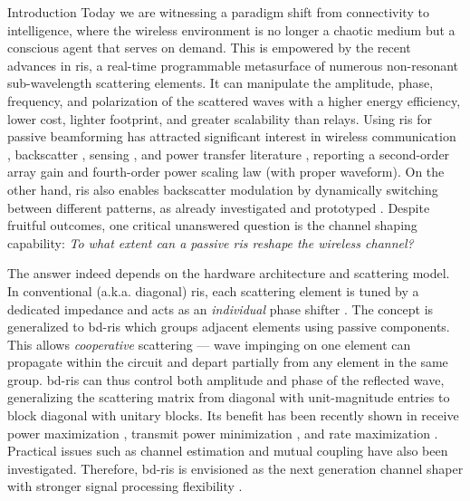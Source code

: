 \documentclass[journal]{IEEEtran}
\begin{document}
\glsresetall

\begin{section}{Introduction}
	Today we are witnessing a paradigm shift from connectivity to intelligence, where the wireless environment is no longer a chaotic medium but a conscious agent that serves on demand.
	This is empowered by the recent advances in \gls{ris}, a real-time programmable metasurface of numerous non-resonant sub-wavelength scattering elements.
	It can manipulate the amplitude, phase, frequency, and polarization of the scattered waves \cite{Basar2019} with a higher energy efficiency, lower cost, lighter footprint, and greater scalability than relays.
	Using \gls{ris} for {passive beamforming} has attracted significant interest in wireless communication \cite{Wu2019,Wu2020c,Yang2020,Zheng2021}, backscatter \cite{Jia2020,Liang2022}, sensing \cite{Liu2022a,Hua2023}, and power transfer literature \cite{Wu2021d,Feng2022,Zhao2022}, reporting a second-order array gain and fourth-order power scaling law (with proper waveform).
	On the other hand, \gls{ris} also enables {backscatter modulation} by dynamically switching between different patterns, as already investigated \cite{Karasik2020,Basar2020,Zhao2022a} and prototyped \cite{Tang2019a,Dai2020a}.
	Despite fruitful outcomes, one critical unanswered question is the {channel shaping} capability: \emph{To what extent can a passive \gls{ris} reshape the wireless channel?}

	The answer indeed depends on the hardware architecture and scattering model.
	In conventional (a.k.a. diagonal) \gls{ris}, each scattering element is tuned by a dedicated impedance and acts as an \emph{individual} phase shifter \cite{Wu2020}.
	The concept is generalized to \gls{bd}-\gls{ris} \cite{Shen2020a,Li2023b} which groups adjacent elements using passive components.
	This allows \emph{cooperative} scattering --- wave impinging on one element can propagate within the circuit and depart partially from any element in the same group.
	\gls{bd}-\gls{ris} can thus control both amplitude and phase of the reflected wave, generalizing the scattering matrix from diagonal with unit-magnitude entries to block diagonal with  unitary blocks.
	Its benefit has been recently shown in receive power maximization \cite{Nerini2023,Santamaria2023,Fang2023,Nerini2023a}, transmit power minimization \cite{Zhou2023}, and rate maximization \cite{Zhou2023,Nerini2023a,Li2023d,Bartoli2023,Li2023c}.
	Practical issues such as channel estimation \cite{Li2023e} and mutual coupling \cite{Li2023f} have also been investigated.
	Therefore, \gls{bd}-\gls{ris} is envisioned as the next generation channel shaper with stronger signal processing flexibility \cite{Li2023g}.


\end{section}
\end{document}
